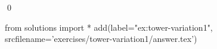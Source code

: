 
\begin{ex} 
  \label{ex:tower-variation1}
  
  \qed
\end{ex} 
\begin{python0}
from solutions import *
add(label="ex:tower-variation1",
    srcfilename='exercises/tower-variation1/answer.tex') 
\end{python0}
